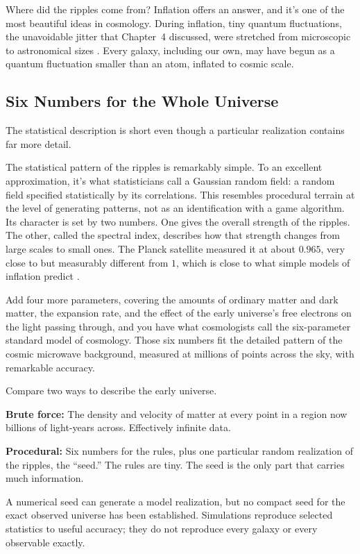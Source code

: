 Where did the ripples come from? Inflation offers an answer, and it's one of the most beautiful ideas in cosmology. During inflation, tiny quantum fluctuations, the unavoidable jitter that Chapter~4 discussed, were stretched from microscopic to astronomical sizes \cite{mukhanov1981}. Every galaxy, including our own, may have begun as a quantum fluctuation smaller than an atom, inflated to cosmic scale.

\subsection{Six Numbers for the Whole Universe}

The statistical description is short even though a particular realization contains far more detail.

The statistical pattern of the ripples is remarkably simple. To an excellent approximation, it's what statisticians call a Gaussian random field: a random field specified statistically by its correlations. This resembles procedural terrain at the level of generating patterns, not as an identification with a game algorithm. Its character is set by two numbers. One gives the overall strength of the ripples. The other, called the spectral index, describes how that strength changes from large scales to small ones. The Planck satellite measured it at about \(0.965\), very close to but measurably different from \(1\), which is close to what simple models of inflation predict \cite{planck2018}.

Add four more parameters, covering the amounts of ordinary matter and dark matter, the expansion rate, and the effect of the early universe's free electrons on the light passing through, and you have what cosmologists call the six-parameter standard model of cosmology. Those six numbers fit the detailed pattern of the cosmic microwave background, measured at millions of points across the sky, with remarkable accuracy.

\begin{examplebox}
Compare two ways to describe the early universe.

\textbf{Brute force:} The density and velocity of matter at every point in a region now billions of light-years across. Effectively infinite data.

\textbf{Procedural:} Six numbers for the rules, plus one particular random realization of the ripples, the ``seed.'' The rules are tiny. The seed is the only part that carries much information.

A numerical seed can generate a model realization, but no compact seed for the exact observed universe has been established. Simulations reproduce selected statistics to useful accuracy; they do not reproduce every galaxy or every observable exactly.
\end{examplebox}

